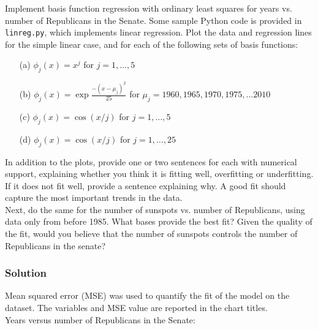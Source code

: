 \documentclass[submit]{harvardml}
\begin{document}
\begin{problem} 

Implement basis function regression with ordinary least squares for
years vs. number of Republicans in the Senate. Some sample Python code
is provided in \verb|linreg.py|, which implements linear regression.
Plot the data and regression lines for the simple linear case, and for
each of the following sets of basis functions:
\begin{itemize}
	\item[(a)] $\phi_j(x) = x^j$ for $j=1, \ldots, 5$ 
	\item[(b)] $\phi_j(x) = \exp{\frac{-(x-\mu_j)^2}{25}}$ for $\mu_j=1960, 1965, 1970, 1975, \ldots 2010$
	\item[(c)] $\phi_j(x) = \cos(x / j)$ for $j=1, \ldots, 5$
	\item[(d)] $\phi_j(x) = \cos(x / j)$ for $j=1, \ldots, 25$
\end{itemize}
In addition to the plots, provide one or two sentences for each with
numerical support, explaining whether you think it is fitting well,
overfitting or underfitting.  If it does not fit well, provide a
sentence explaining why. A good fit should capture the most important
trends in the data.\\ 

\noindent Next, do the same for the number of sunspots vs. number of
Republicans, using data only from before 1985.  What bases provide the
best fit?  Given the quality of the fit, would you believe that the
number of sunspots controls the number of Republicans in the senate?


\end{problem}



\subsubsection*{Solution}

Mean squared error (MSE) was used to quantify the fit of the model on the dataset. The variables and MSE value are reported in the chart titles. \\

Years versus number of Republicans in the Senate:
\end{document}
